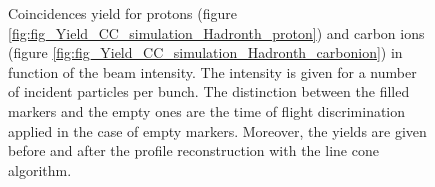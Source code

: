 \begin{figure} [!h]
\caption{Coincidences yield for protons (figure \ref{fig:fig_Yield_CC_simulation_Hadronth_proton}) and carbon ions (figure \ref{fig:fig_Yield_CC_simulation_Hadronth_carbonion}) in function of the beam intensity. The intensity is given for a number of incident particles per bunch. The distinction between the filled markers and the empty ones are the time of flight discrimination applied in the case of empty markers. Moreover, the yields are given before and after the profile reconstruction with the line cone algorithm.}
  \label{fig:coincidences}
\end{figure}

